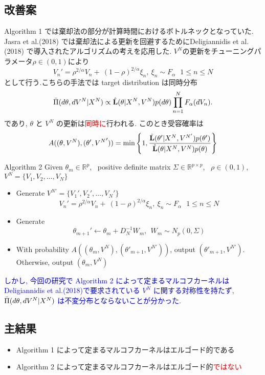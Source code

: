 \documentclass[portrait,a0]{a0poster}
\begin{document}
\subsection{改善案}
Algorithm 1 では棄却法の部分が計算時間におけるボトルネックとなっていた. Jasra et al.(2018) では棄却法による更新を回避するためにDeligiannidis et al.(2018) で導入されたアルゴリズムの考えを応用した.
$V^{N}$の更新をチューニングパラメータ$\rho \in (0,1)$により
$$
V_{n}'  = {\rho}^{2/\alpha}V_n +  \ (1-\rho)^{2/\alpha}{\xi}_n,\ {\xi}_n \sim F_{\alpha} \ \ \ 1 \le n \le N
$$
として行う.こちらの手法では target distribution は同時分布
$$
\Bar{\Pi}(d\theta,dV^N|X^N) \propto \Hat{\mathbf{L}}(\theta|X^{N},V^{N})p(d\theta)\prod_{n=1}^{N}F_{\alpha}(dV_{n}).
$$
であり, $\theta$ と $V^N$ の更新は\textcolor{red}{同時に}行われる. このとき受容確率は
$$A((\theta,V^{N}),(\theta',{V^N}'))
     = 
     \min\left\{1,
\frac{\Hat{\mathbf{L}}(\theta'|X^{N},V^{N'})p(\theta')}
{ \Hat{\mathbf{L}}(\theta|X^{N},V^{N})p(\theta)}
\right\}$$
\begin{itembox}[H]{Algorithm 2}
 Given $\theta_{m} \in \mathbb{R}^{p}$, \ positive definite matrix $ \Sigma \in \mathbb{R}^{p \times p}$, \ $\rho \in (0,1)$, $V^{N} = \{ V_1,V_2,\ldots,V_{N}\}$ 
\begin{itemize}
\item Generate $V^{N'} = \{ V_1',V_2',\ldots,V_{N}'\}$
$$
V_{n}'  = {\rho}^{2/\alpha}V_n +  \ (1-\rho)^{2/\alpha}{\xi}_n,\ {\xi}_n \sim F_{\alpha} \ \ \ 1 \le n \le N 
$$ 
\item Generate
$$
\theta_{m+1}'  \gets \theta_{m} + D_{N}^{-1}W_{m}, \ \ W_{m} \sim N_{p}(0,\Sigma)
$$ 
\item With probability 
$A((\theta_{m},V^{N}),(\theta'_{m+1},V^{N'}))$,
output $(\theta'_{m+1},V^{N'})$. Otherwise, output $(\theta_{m},V^{N})$ 
\end{itemize} 
\end{itembox}
\textcolor{blue}{
しかし, 今回の研究で Algorithm 2 によって定まるマルコフカーネルは Deligiannidis et al.(2018)で要求されている $V^N$ に関する対称性を持たず, $\Bar{\Pi}(d\theta,dV^N|X^N)$ は不変分布とならないことが分かった.}
\subsection{主結果}
\begin{itemize}
    \item Algorithm 1 によって定まるマルコフカーネルはエルゴード的である
    \item Algorithm 2 によって定まるマルコフカーネルはエルゴード的\textcolor{red}{ではない}
\end{itemize}
\end{document}

